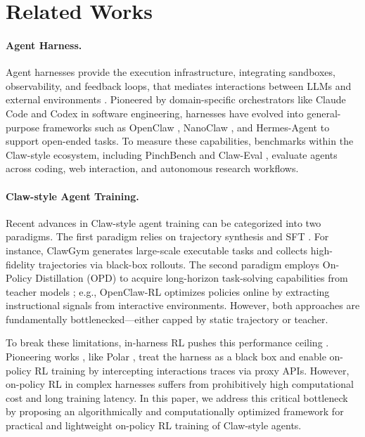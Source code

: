 \documentclass[letterpaper]{article} %
\begin{document}
\section{Related Works}

\paragraph{Agent Harness.}
Agent harnesses provide the execution infrastructure, integrating sandboxes, observability, and feedback loops, that mediates interactions between LLMs and external environments \citep{lopopolo2026harness}. 
Pioneered by domain-specific orchestrators like Claude Code \citep{anthropic2025claudecode} and Codex \citep{openai2025codex} in software engineering, harnesses have evolved into general-purpose frameworks such as OpenClaw \citep{steinberger2026openclaw}, NanoClaw \citep{nanoclaw2026}, and Hermes-Agent \citep{nousresearch2026hermes} to support open-ended tasks. 
To measure these capabilities, benchmarks within the Claw-style ecosystem, including PinchBench \citep{kiloaiteam2026pinchbench} and Claw-Eval \citep{ye2026claw}, evaluate agents across coding, web interaction, and autonomous research workflows.

\paragraph{Claw-style Agent Training.}
Recent advances in Claw-style agent training can be categorized into two paradigms. 
The first paradigm relies on trajectory synthesis and SFT \citep{bai2026clawgym, li2026clawenvkit, xia2026metaclaw}. 
For instance, ClawGym \citep{bai2026clawgym} generates large-scale executable tasks and collects high-fidelity trajectories via black-box rollouts. 
The second paradigm employs On-Policy Distillation (OPD) to acquire long-horizon task-solving capabilities from teacher models \citep{wang2026openclaw, yang2026nemotron, bai2026scaling}; e.g., OpenClaw-RL \citep{wang2026openclaw} optimizes policies online by extracting instructional signals from interactive environments. 
However, both approaches are fundamentally bottlenecked—either capped by static trajectory or teacher.

To break these limitations, in-harness RL pushes this performance ceiling \citep{yue2025does,guo2025deepseek}. 
Pioneering works \citep{xu2026polar,bai2026clawgym}, like Polar \citep{xu2026polar}, treat the harness as a black box and enable on-policy RL training by intercepting interactions traces via proxy APIs. 
However, on-policy RL in complex harnesses suffers from prohibitively high computational cost and long training latency.
In this paper, we address this critical bottleneck by proposing an algorithmically and computationally optimized framework for practical and lightweight on-policy RL training of Claw-style agents.
\end{document}
